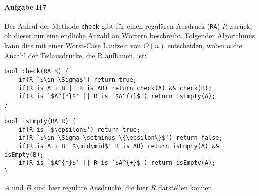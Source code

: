 \documentclass[11pt]{article}
\begin{document}

\paragraph{Aufgabe H7}
Der Aufruf der Methode \verb|check| gibt für einen regulären Ausdruck (\verb|RA|) $R$ zurück, ob dieser nur eine endliche Anzahl an Wörtern beschreibt. Folgender Algorithmus kann dies mit einer Worst-Case Laufzeit von $O(n)$ entscheiden, wobei $n$ die Anzahl der Teilausdrücke, die R aufbauen, ist:
\begin{lstlisting}[escapeinside=`']
bool check(RA R) {
	if(R `$\in \Sigma$') return true;
	if(R is A + B || R is AB) return check(A) && check(B);
	if(R is `$A^{*}$' || R is `$A^{+}$') return isEmpty(A);
}

bool isEmpty(RA R) {
	if(R is `$\epsilon$') return true;
	if(R `$\in \Sigma \setminus \{\epsilon\}$') return false;
	if(R is A + B `$\mid\mid$' R is AB) return isEmpty(A) && isEmpty(B);
	if(R is `$A^{*}$' || R is `$A^{+}$') return isEmpty(A);
}
\end{lstlisting}
$A$ und $B$ sind hier reguläre Ausdrücke, die hier $R$ darstellen können.
\end{document}
